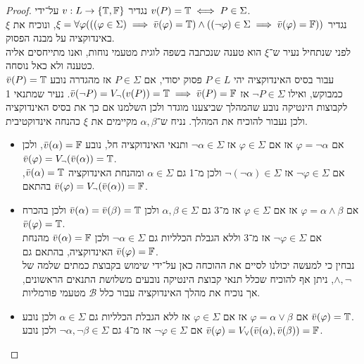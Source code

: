 \begin{proof}
	נגדיר $v : L \to \{ \mathbb{T}, \mathbb{F} \}$ על־ידי $v(P) = \mathbb{T} \iff P \in \Sigma$. \\
	נגדיר $\xi = \forall \varphi (((\varphi \in \Sigma) \implies \bar{v}(\varphi) = \mathbb{T}) \land ((\lnot \varphi) \in \Sigma \implies \bar{v}(\varphi) = \mathbb{F}))$, ונוכיח את $\xi$ באינדוקציה על מבנה הפסוק. \\
	לפני שנתחיל נעיר ש־$\xi$ הוא טענה שנכתבה בשפה לוגית מטעמי נוחות, ואנו מתייחסים אליה כטענה ולא כאל נוסחה. \\
	עבור בסיס האינדוקציה יהי $P \in L$ פסוק יסודי, אם $P \in \Sigma$ אז מהגדרה נובע $\bar{v}(P) = \mathbb{T}$ כמבוקש, ואילו $\lnot P \in \Sigma$ אז $\bar{v}(\lnot P) = V_\lnot(v(P)) = \mathbb{T} \implies \bar{v}(P) = \mathbb{F}$.
	נעיר שמתנאי 1 לקבוצות הינטיקה נובע שהמהלך שביצענו מוגדר ולכן השלמנו אם כך את בסיס האינדוקציה ולכן נעבור להוכיח את המהלך.
	נניח ש־$\alpha, \beta$ מקיימים את $\xi$ כהנחה אינדוקטיבית.
	\begin{itemize}
		\item אם $\varphi = \lnot \alpha$ אז אם $\varphi \in \Sigma$ אז $\lnot \alpha \in \Sigma$ ותנאי האינדוקציה חל, נובע $\bar{v}(\alpha) = \mathbb{F}$, ולכן $\bar{v}(\varphi) = V_\lnot(\bar{v}(\alpha)) = \mathbb{T}$. \\
			אם $\lnot \varphi \in \Sigma$ אז $\lnot (\lnot \alpha) \in \Sigma$ ולכן מ־1 גם $\alpha \in \Sigma$ ומהנחת האינדוקציה $\bar{v}(\alpha) = \mathbb{T}$, בהתאם $\bar{v}(\varphi) = V_\lnot(\bar{v}(\alpha)) = \mathbb{F}$.
		\item אם $\varphi = \alpha \land \beta$ אז אם $\varphi \in \Sigma$ אז מ־3 גם $\alpha, \beta \in \Sigma$ ולכן $\bar{v}(\alpha) = \bar{v}(\beta) = \mathbb{T}$ ולכן בהכרח $\bar{v}(\varphi) = \mathbb{T}$. \\
			אם $\lnot \varphi \in \Sigma$ אז מ־3 וללא הגבלת הכלליות גם $\lnot \alpha \in \Sigma$ ולכן $\bar{v}(\alpha) = \mathbb{F}$ מהנחת האינדוקציה, בהתאם גם $\bar{v}(\varphi) = \mathbb{F}$. \\
			נבחין כי למעשה יכולנו לסיים את ההוכחה כאן על־ידי שימוש בקבוצת כמתים שלמה של $\land, \lnot$, ניתן אף להוכיח שכלל תנאי קבוצת הינטיקה נובעים משלושת התנאים הראשונים,
			אך נוכיח את מהלך האינדוקציה עבור כלל $\mathcal{B}$ מטעמי פורמליות.
		\item אם $\varphi = \alpha \lor \beta$ אז אם $\varphi \in \Sigma$ אז ללא הגבלת הכלליות גם $\alpha \in \Sigma$ ולכן נובע $\bar{v}(\varphi) = \mathbb{T}$. \\
			אם $\lnot \varphi \in \Sigma$ אז מ־4 גם $\lnot \alpha, \lnot \beta \in \Sigma$ ולכן נובע $\bar{v}(\varphi) = V_\lor(\bar{v}(\alpha), \bar{v}(\beta)) = \mathbb{F}$.

\end{itemize}
\end{proof}
